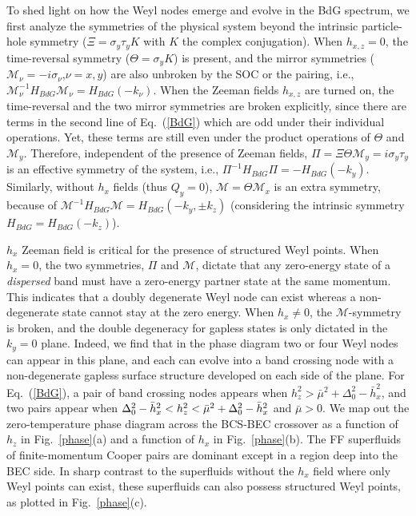 \documentclass[prl,aps,twocolumn,showpacs,floatfix]{revtex4}
\begin{document}
To shed light on how the Weyl nodes emerge and evolve in the BdG spectrum,
we first analyze the symmetries of the physical system beyond the intrinsic
particle-hole symmetry ($\Xi =\sigma _{y}\tau _{y}K$ with $K$ the complex
conjugation). When $h_{x,z}=0$, the time-reversal symmetry ($\Theta =\sigma
_{y}K$) is present, and the mirror symmetries ($\mathcal{M}_{\nu }=-i\sigma
_{\nu }$,\thinspace $\nu =x,y$) are also unbroken by the SOC or the pairing,
i.e., $\mathcal{M}_{\nu }^{-1}H_{BdG}\mathcal{M}_{\nu }=H_{BdG}(-k_{\nu })$.
When the Zeeman fields $h_{x,z}$ are turned on, the time-reversal and the
two mirror symmetries are broken explicitly, since there are terms in the
second line of Eq.~(\ref{BdG}) which are odd under their individual
operations. Yet, these terms are still even under the product operations of $%
\Theta $ and $\mathcal{M}_{y}$. Therefore, independent of the presence of
Zeeman fields, $\Pi =\Xi \Theta \mathcal{M}_{y}=i\sigma _{y}\tau _{y}$ is an
effective symmetry of the system, i.e., $\Pi ^{-1}H_{BdG}\Pi
=-H_{BdG}(-k_{y})$. Similarly, without $h_{x}$ fields (thus $Q_{y}=0$), $%
\mathcal{M}=\Theta \mathcal{M}_{x}$ is an extra symmetry, because of $%
\mathcal{M}^{-1}H_{BdG}\mathcal{M}=H_{BdG}(-k_{y},\pm k_{z})$ (considering
the intrinsic symmetry $H_{BdG}=H_{BdG}(-k_{z})$).

$h_{x}$ Zeeman field is critical for the presence of structured Weyl points.
When $h_{x}=0$, the two symmetries, $\Pi$ and $\mathcal{M}$, dictate that
any zero-energy state of a \textit{dispersed} band must have a zero-energy
partner state at the same momentum. This indicates that a doubly degenerate
Weyl node can exist whereas a non-degenerate state cannot stay at the zero
energy. When $h_{x}\neq 0$, the $\mathcal{M}$-symmetry is broken, and the
double degeneracy for gapless states is only dictated in the $k_y=0$ plane.
Indeed, we find that in the phase diagram two or four Weyl nodes can appear
in this plane, and each can evolve into a band crossing node with a
non-degenerate gapless surface structure developed on each side of the
plane. For Eq.~(\ref{BdG}), a pair of band crossing nodes appears when $%
h_{z}^2>\bar\mu^{2}+\Delta_{0}^{2}-\bar{h}_{x}^{2}$, and two pairs appear
when $\Delta_{0}^{2}-\bar{h}_{x}^{2}<h_{z}^2<\bar\mu^{2}+\Delta_{0}^{2}-\bar{%
h}_{x}^{2}$ and $\bar\mu>0$. We map out the zero-temperature phase diagram
across the BCS-BEC crossover as a function of $h_{z}$ in Fig.~\ref{phase}(a)
and a function of $h_{x}$ in Fig.~\ref{phase}(b). The FF superfluids of
finite-momentum Cooper pairs are dominant except in a region deep into the
BEC side. In sharp contrast to the superfluids without the $h_x$ field where
only Weyl points can exist, these superfluids can also possess structured
Weyl points, as plotted in Fig.~\ref{phase}(c).
\end{document}
